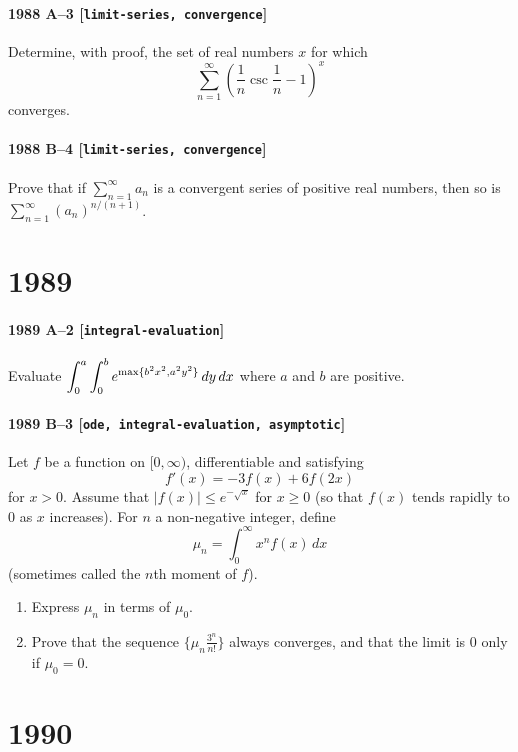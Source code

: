 \documentclass[11pt]{article}
\begin{document}
\paragraph{1988 A--3 \textnormal{[\texttt{limit-series, convergence}]}}
Determine, with proof, the set of real numbers $x$ for which
\[
\sum_{n=1}^\infty \left( \frac{1}{n} \csc \frac{1}{n} - 1 \right)^x
\]
converges.

\paragraph{1988 B--4 \textnormal{[\texttt{limit-series, convergence}]}}
Prove that if $\sum_{n=1}^\infty a_n$ is a convergent series of
positive real numbers, then so is $\sum_{n=1}^\infty (a_n)^{n/(n+1)}$.

\section*{1989}

\paragraph{1989 A--2 \textnormal{[\texttt{integral-evaluation}]}}
Evaluate
$\displaystyle{\int_0^a\int_0^b e^{{\rm max}\{b^2x^2, a^2y^2\}}\,dy\,dx}$
where $a$ and $b$ are positive.

\paragraph{1989 B--3 \textnormal{[\texttt{ode, integral-evaluation, asymptotic}]}}
Let $f$ be a function on $[0,\infty)$, differentiable and satisfying
\[
f'(x)=-3f(x)+6f(2x)
\]
for $x>0$. Assume that $|f(x)|\le e^{-\sqrt{x}}$ for $x\ge 0$ (so that
$f(x)$ tends rapidly to $0$ as $x$ increases).
For $n$ a non-negative integer, define
\[
\mu_n=\int_0^\infty x^n f(x)\,dx
\]
(sometimes called the $n$th moment of $f$).
\begin{enumerate}
\item[a)] Express $\mu_n$ in terms of $\mu_0$.
\item[b)] Prove that the sequence $\{\mu_n \frac{3^n}{n!}\}$ always converges,
and that the limit is $0$ only if $\mu_0=0$.
\end{enumerate}

\section*{1990}
\end{document}
